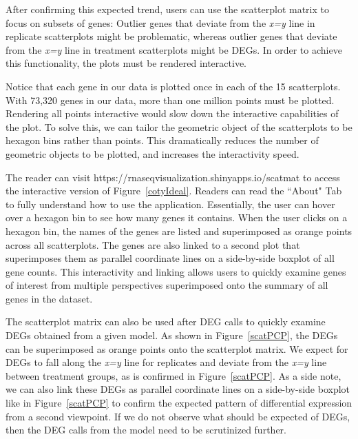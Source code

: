 \documentclass{bioinfo}
\begin{document}
After confirming this expected trend, users can use the scatterplot matrix to focus on subsets of genes: Outlier genes that deviate from the \textit{x=y} line in replicate scatterplots might be problematic, whereas outlier genes that deviate from the \textit{x=y} line in treatment scatterplots might be DEGs. In order to achieve this functionality, the plots must be rendered interactive.

Notice that each gene in our data is plotted once in each of the 15 scatterplots. With 73,320 genes in our data, more than one million points must be plotted. Rendering all points interactive would slow down the interactive capabilities of the plot. To solve this, we can tailor the geometric object of the scatterplots to be hexagon bins rather than points. This dramatically reduces the number of geometric objects to be plotted, and increases the interactivity speed.

The reader can visit https://rnaseqvisualization.shinyapps.io/scatmat to access the interactive version of Figure~\ref{cotyIdeal}. Readers can read the ``About" Tab to fully understand how to use the application. Essentially, the user can hover over a hexagon bin to see how many genes it contains. When the user clicks on a hexagon bin, the names of the genes are listed and superimposed as orange points across all scatterplots. The genes are also linked to a second plot that superimposes them as parallel coordinate lines on a side-by-side boxplot of all gene counts. This interactivity and linking allows users to quickly examine genes of interest from multiple perspectives superimposed onto the summary of all genes in the dataset. 

The scatterplot matrix can also be used after DEG calls to quickly examine DEGs obtained from a given model. As shown in Figure~\ref{scatPCP}, the DEGs can be superimposed as orange points onto the scatterplot matrix. We expect for DEGs to fall along the \textit{x=y} line for replicates and deviate from the \textit{x=y} line between treatment groups, as is confirmed in Figure~\ref{scatPCP}. As a side note, we can also link these DEGs as parallel coordinate lines on a side-by-side boxplot like in Figure~\ref{scatPCP} to confirm the expected pattern of differential expression from a second viewpoint. If we do not observe what should be expected of DEGs, then the DEG calls from the model need to be scrutinized further.

\end{document}
